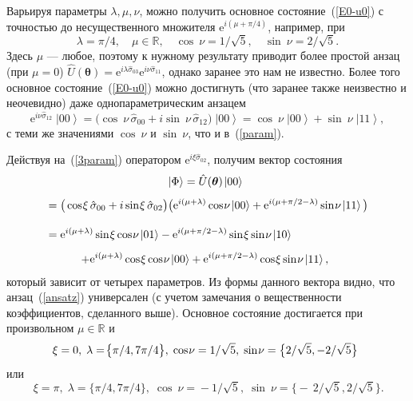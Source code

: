 \documentclass[a4paper]{report}
\newcommand{\ket}[1] {\!\!\;\ensuremath{\left|#1\right\rangle}}
\begin{document}
Варьируя параметры $\lambda,\mu,\nu$, можно получить основное состояние~(\ref{E0-u0}) с точностью до несущественного множителя $\mathrm{e}^{i(\mu+\pi/4)}$, например, при
\begin{equation}\label{param}
\lambda=\pi/4, \quad \mu\in\mathbb{R}, \quad \cos\:\!\!\nu=1/\sqrt{5},
\quad
\sin\:\!\!\nu=2/\sqrt{5}.
\end{equation}
Здесь $\mu$ --- любое, поэтому к нужному результату приводит более простой анзац (при $\mu=0$) $\hat{U}(\bm\theta)= \mathrm{e}^{i\lambda\hat{\sigma}_{03}} \mathrm{e}^{i\nu\hat{\sigma}_{11}}$, однако заранее это нам не известно. Более того основное состояние~(\ref{E0-u0}) можно достигнуть (что заранее также неизвестно и неочевидно) даже однопараметрическим анзацем
\begin{equation*}\label{}
\mathrm{e}^{i\nu\hat{\sigma}_{12}}\ket{00}= \big(\cos\:\!\!\nu\,\hat{\sigma}_{00}+ i\sin\:\!\!\nu\,\hat{\sigma}_{12}\big)\ket{00}= \cos\:\!\!\nu\ket{00}+ \sin\:\!\!\nu\ket{11},
\nonumber
\end{equation*}
с теми же значениями $\cos\:\!\!\nu$ и $\sin\:\!\!\nu$, что и в~(\ref{param}).

Действуя на~(\ref{3param}) оператором $\mathrm{e}^{i\xi\hat{\sigma}_{02}}$, получим вектор состояния
\begin{multline}\label{Phi0}
\ket{\Phi}= \hat{U}(\bm\theta)\ket{00}\;\\
=\big(\cos\:\!\!\xi\,\hat{\sigma}_{00}+ i\sin\:\!\!\xi\,\hat{\sigma}_{02}\big) \big(\mathrm{e}^{i(\mu+\lambda)}\cos\:\!\!\nu\ket{00}+ \mathrm{e}^{i(\mu+\pi/2-\lambda)}\sin\:\!\!\nu\ket{11}\big)\! \vphantom{\int}\\
=\mathrm{e}^{i(\mu+\lambda)}\sin\:\!\!\xi\cos\:\!\!\nu\ket{01}- \mathrm{e}^{i(\mu+\pi/2-\lambda)}\sin\:\!\!\xi\sin\:\!\!\nu\ket{10}
\hspace{6.5em} \vphantom{\int}\\
+\mathrm{e}^{i(\mu+\lambda)}\cos\:\!\!\xi\cos\:\!\!\nu\ket{00}+ \mathrm{e}^{i(\mu+\pi/2-\lambda)}\cos\:\!\!\xi\sin\:\!\!\nu\ket{11},\;\,
\end{multline}
который зависит от четырех параметров. Из формы данного вектора видно, что анзац~(\ref{ansatz}) универсален (с учетом замечания о вещественности коэффициентов, сделанного выше). Основное состояние достигается при произвольном $\mu\in\mathbb{R}$ и
\begin{equation}\label{param1}
\!\!\xi=0, \;\lambda=\!\big\{\pi/4,7\pi/4\big\}, \; \cos\:\!\!\nu=1/\sqrt{5},
\; \sin\:\!\!\nu=\big\{2/\sqrt{5},-2/\sqrt{5}\big\}\\
\end{equation}
или
\begin{equation}\label{param2}
\,\xi=\pi, \;\lambda=\!\big\{\pi/4,7\pi/4\big\}, \; {\cos\:\!\!\nu}=\!-1/\sqrt{5},
\; {\sin\:\!\!\nu}=\big\{\!\!-\:\!\!2/\sqrt{5},2/\sqrt{5}\big\}.
\end{equation}
\end{document}
